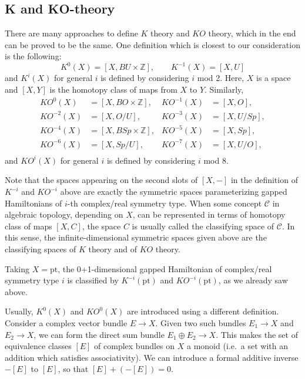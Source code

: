 \documentclass[12pt]{article}
\numberwithin{equation}{section}
\numberwithin{figure}{section}
\theoremstyle{remark}
\def\bZ{\mathbb{Z}}
\def\pt{\mathrm{pt}}
\begin{document}
\subsection{K and KO-theory}
There are many approaches to define $K$ theory and $KO$ theory,
which in the end can be proved to be the same. 
One definition which is closest to our consideration is the following: 
\begin{equation}
K^0(X) = [X, BU\times \bZ],\qquad K^{-1}(X)=[X, U]
\end{equation}  and $K^i(X)$ for general $i$ is defined by considering $i$ mod 2.
Here, $X$ is a space and $[X,Y]$ is the homotopy class of maps from $X$ to $Y$.
Similarly, \begin{equation}
\begin{aligned}
KO^0(X)&=[X,BO\times \bZ], &
KO^{-1}(X)&=[X,O], \\
KO^{-2}(X)&=[X,O/U],&
KO^{-3}(X)&=[X,U/Sp],\\
KO^{-4}(X)&=[X,BSp\times \bZ], &
KO^{-5}(X)&=[X,Sp], \\
KO^{-6}(X)&=[X,Sp/U],&
KO^{-7}(X)&=[X,U/O],\\
\end{aligned}
\end{equation} and $KO^i(X)$ for general $i$ is defined by considering $i$ mod 8.

Note that the spaces appearing on the second slots of $[X,-]$ in the definition of $K^{-i}$ 
and $KO^{-i}$ above  are exactly the symmetric spaces parameterizing gapped Hamiltonians
of $i$-th complex/real symmetry type.
When some concept $\mathcal{C}$ in algebraic topology, depending on $X$,
can be represented in terms of homotopy class of maps $[X,C]$,
the space $C$ is usually called the classifying space of $\mathcal{C}$.
In this sense, the infinite-dimensional symmetric spaces given above are the classifying spaces of $K$ theory
and of $KO$ theory.

Taking $X=\pt$, 
the 0+1-dimensional gapped Hamiltonian of complex/real symmetry type $i$ is classified by 
$K^{-i}(\pt)$ and $KO^{-i}(\pt)$, as we already saw above.

Usually, $K^0(X)$ and $KO^0(X)$ are introduced using a different definition.
Consider a complex vector bundle $E\to X$.
Given two such bundles $E_1\to X$ and $E_2\to X$, we can form the direct sum bundle $E_1\oplus E_2\to X$.
This makes the set of equivalence classes $[E]$ of complex bundles on $X$ a monoid (i.e.~a set with an addition
which satisfies associativity).
We can introduce a formal additive inverse $-[E]$ to $[E]$, so that $[E]+ (-[E])=0$.
\end{document}
